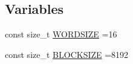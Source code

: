 \subsection*{Variables}
\begin{DoxyCompactItemize}
\item 
const size\-\_\-t \hyperlink{group__memalloc__grp_ga40956ef8f797399b4f478df9fc1566f4}{W\-O\-R\-D\-S\-I\-Z\-E} =16
\item 
const size\-\_\-t \hyperlink{group__memalloc__grp_gaf4df087b6f47e514f6062f7ada2d19d7}{B\-L\-O\-C\-K\-S\-I\-Z\-E} =8192
\end{DoxyCompactItemize}

